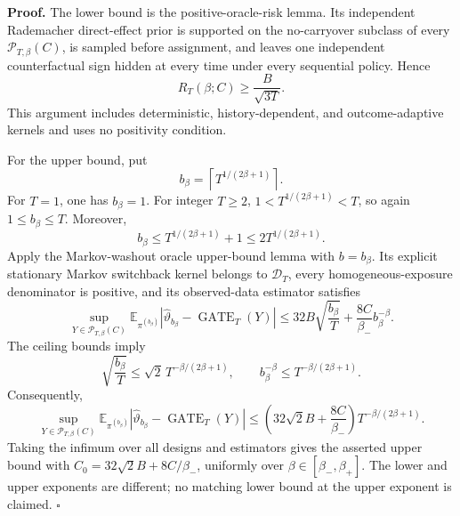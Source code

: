 \textbf{Proof.} The lower bound is the positive-oracle-risk lemma. Its independent Rademacher direct-effect prior is supported on the no-carryover subclass of every \(\mathcal P_{T,\beta}(C)\), is sampled before assignment, and leaves one independent counterfactual sign hidden at every time under every sequential policy. Hence
\[
R_T(\beta;C)\ge \frac{B}{\sqrt{3T}}.
\]
This argument includes deterministic, history-dependent, and outcome-adaptive kernels and uses no positivity condition.

For the upper bound, put
\[
b_\beta=\left\lceil T^{1/(2\beta+1)}\right\rceil.
\]
For \(T=1\), one has \(b_\beta=1\). For integer \(T\ge2\), \(1<T^{1/(2\beta+1)}<T\), so again \(1\le b_\beta\le T\). Moreover,
\[
b_\beta\le T^{1/(2\beta+1)}+1\le2T^{1/(2\beta+1)}.
\]
Apply the Markov-washout oracle upper-bound lemma with \(b=b_\beta\). Its explicit stationary Markov switchback kernel belongs to \(\mathcal D_T\), every homogeneous-exposure denominator is positive, and its observed-data estimator satisfies
\[
\sup_{Y\in\mathcal P_{T,\beta}(C)}
\mathbb E_{\pi^{(b_\beta)}}
\left|\widehat\vartheta_{b_\beta}-\operatorname{GATE}_T(Y)\right|
\le 32B\sqrt{\frac{b_\beta}{T}}
+\frac{8C}{\beta_-}b_\beta^{-\beta}.
\]
The ceiling bounds imply
\[
\sqrt{\frac{b_\beta}{T}}
\le\sqrt2\,T^{-\beta/(2\beta+1)},
\qquad
b_\beta^{-\beta}\le T^{-\beta/(2\beta+1)}.
\]
Consequently,
\[
\sup_{Y\in\mathcal P_{T,\beta}(C)}
\mathbb E_{\pi^{(b_\beta)}}
\left|\widehat\vartheta_{b_\beta}-\operatorname{GATE}_T(Y)\right|
\le
\left(32\sqrt2 B+\frac{8C}{\beta_-}\right)
T^{-\beta/(2\beta+1)}.
\]
Taking the infimum over all designs and estimators gives the asserted upper bound with \(C_0=32\sqrt2 B+8C/\beta_-\), uniformly over \(\beta\in[\beta_-,\beta_+]\). The lower and upper exponents are different; no matching lower bound at the upper exponent is claimed. \(\square\)
